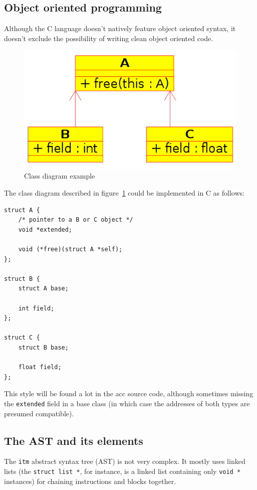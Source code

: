 \documentclass[12pt, a4paper]{article}
\begin{document}
  \subsection{Object oriented programming}
Although the C language doesn't natively feature object oriented syntax, it doesn't
exclude the possibility of writing clean object oriented code.

\begin{figure}[h]
\begin{center}
\includegraphics[resolution=256]{ABC.png}
\caption{Class diagram example}
\label{fig:abc}
\end{center}
\end{figure}

The class diagram described in figure~\ref{fig:abc} could be implemented in
C as follows:

\begin{lstlisting}
struct A {
	/* pointer to a B or C object */
	void *extended;

	void (*free)(struct A *self);
};

struct B {
	struct A base;

	int field;
};

struct C {
	struct B base;

	float field;
};
\end{lstlisting}

This style will be found a lot in the acc source code, although sometimes
missing the \verb+extended+ field in a base class (in which case the addresses
of both types are presumed compatible).

  \subsection{The AST and its elements}
The \verb+itm+ abstract syntax tree (AST) is not very complex. It mostly uses
linked lists (the \verb+struct list *+, for instance, is a linked list containing
only \verb+void *+ instances) for chaining instructions and blocks together.
\end{document}
